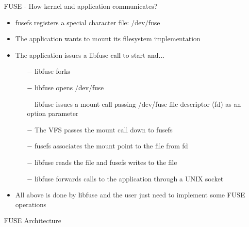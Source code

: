 \documentclass{beamer}
\begin{document}
\begin{frame}{FUSE - How kernel and application communicates?}
	
	\begin{itemize}[<+->]

		\item{fusefs registers a special character file: /dev/fuse}
		\item{The application wants to mount its filesystem implementation}
		\item{The application issues a libfuse call to start and...}
		\begin{itemize}
			\item[$-$]{libfuse forks}
			\item[$-$]{libfuse opens /dev/fuse}
			\item[$-$]{libfuse issues a mount call passing /dev/fuse file descriptor (fd) as an option parameter}
			\item[$-$]{The VFS passes the mount call down to fusefs}
			\item[$-$]{fusefs associates the mount point to the file from fd}
			\item[$-$]{libfuse reads the file and fusefs writes to the file}
			\item[$-$]{libfuse forwards calls to the application through a UNIX socket}			
		\end{itemize}
		\item{All above is done by libfuse and the user just need to implement some FUSE operations}

	\end{itemize}
	
	\let\thefootnote\relax{}
	
\end{frame}

\begin{frame}{FUSE Architecture}
	
	
	\let\thefootnote\relax{}
	
\end{frame}
\end{document}
